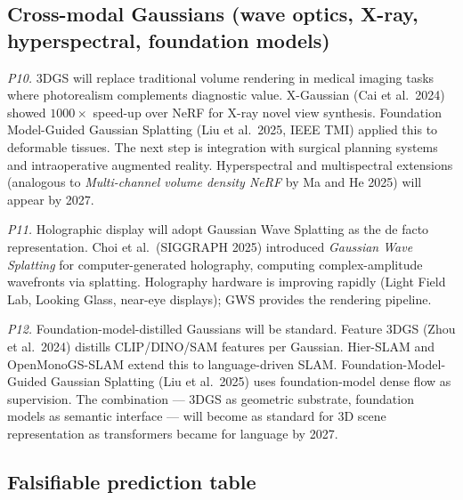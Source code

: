 \subsection{Cross-modal Gaussians (wave optics, X-ray, hyperspectral, foundation models)}\label{cross-modal-gaussians-wave-optics-x-ray-hyperspectral-foundation-models}

\emph{P10.} 3DGS will replace traditional volume rendering in medical imaging tasks where photorealism complements diagnostic value. X-Gaussian (Cai et al.~2024) showed \(1000\times\) speed-up over NeRF for X-ray novel view synthesis. Foundation Model-Guided Gaussian Splatting (Liu et al.~2025, IEEE TMI) applied this to deformable tissues. The next step is integration with surgical planning systems and intraoperative augmented reality. Hyperspectral and multispectral extensions (analogous to \emph{Multi-channel volume density NeRF} by Ma and He 2025) will appear by 2027.

\emph{P11.} Holographic display will adopt Gaussian Wave Splatting as the de facto representation. Choi et al.~(SIGGRAPH 2025) introduced \emph{Gaussian Wave Splatting} for computer-generated holography, computing complex-amplitude wavefronts via splatting. Holography hardware is improving rapidly (Light Field Lab, Looking Glass, near-eye displays); GWS provides the rendering pipeline.

\emph{P12.} Foundation-model-distilled Gaussians will be standard. Feature 3DGS (Zhou et al.~2024) distills CLIP/DINO/SAM features per Gaussian. Hier-SLAM and OpenMonoGS-SLAM extend this to language-driven SLAM. Foundation-Model-Guided Gaussian Splatting (Liu et al.~2025) uses foundation-model dense flow as supervision. The combination --- 3DGS as geometric substrate, foundation models as semantic interface --- will become as standard for 3D scene representation as transformers became for language by 2027.

\subsection{Falsifiable prediction table}\label{falsifiable-prediction-table}

